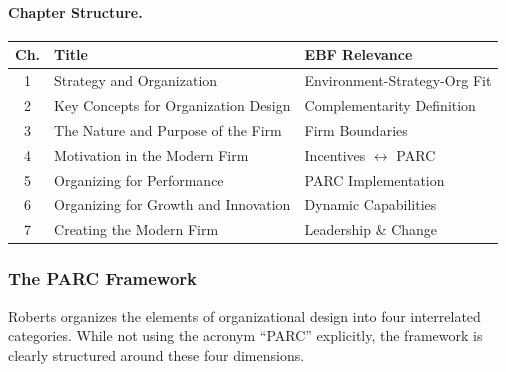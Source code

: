 \paragraph{Chapter Structure.}
\begin{center}
\renewcommand{\arraystretch}{1.3}
\begin{tabular}{|c|l|l|}
\hline
\textbf{Ch.} & \textbf{Title} & \textbf{EBF Relevance} \\
\hline
1 & Strategy and Organization & Environment-Strategy-Org Fit \\
2 & Key Concepts for Organization Design & Complementarity Definition \\
3 & The Nature and Purpose of the Firm & Firm Boundaries \\
4 & Motivation in the Modern Firm & Incentives $\leftrightarrow$ PARC \\
5 & Organizing for Performance & PARC Implementation \\
6 & Organizing for Growth and Innovation & Dynamic Capabilities \\
7 & Creating the Modern Firm & Leadership \& Change \\
\hline
\end{tabular}
\end{center}

\subsubsection{The PARC Framework}
\label{sec:parc}

Roberts organizes the elements of organizational design into four interrelated 
categories. While not using the acronym ``PARC'' explicitly, the framework is 
clearly structured around these four dimensions.

